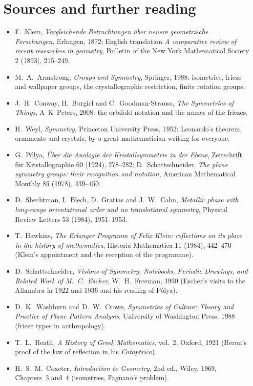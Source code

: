 \section*{Sources and further reading}

\begin{itemize}
\item F.~Klein, \emph{Vergleichende Betrachtungen \"uber neuere geometrische Forschungen}, Erlangen, 1872; English translation \emph{A
comparative review of recent researches in geometry}, Bulletin of the New York Mathematical Society 2 (1893), 215--249.
\item M.~A.~Armstrong, \emph{Groups and Symmetry}, Springer, 1988: isometries, frieze and wallpaper groups, the crystallographic restriction,
finite rotation groups.
\item J.~H.~Conway, H.~Burgiel and C.~Goodman-Strauss, \emph{The Symmetries of Things}, A~K~Peters, 2008: the orbifold notation and the names of
the friezes.
\item H.~Weyl, \emph{Symmetry}, Princeton University Press, 1952: Leonardo's theorem, ornaments and crystals, by a great mathematician writing
for everyone.
\item G.~P\'olya, \emph{\"Uber die Analogie der Kristallsymmetrie in der Ebene}, Zeitschrift f\"ur Kristallographie 60 (1924), 278--282;
D.~Schattschneider, \emph{The plane symmetry groups: their recognition and notation}, American Mathematical Monthly 85 (1978), 439--450.
\item D.~Shechtman, I.~Blech, D.~Gratias and J.~W.~Cahn, \emph{Metallic phase with long-range orientational order and no translational
symmetry}, Physical Review Letters 53 (1984), 1951--1953.
\item T.~Hawkins, \emph{The Erlanger Programm of Felix Klein: reflections on its place in the history of mathematics}, Historia
Mathematica 11 (1984), 442--470 (Klein's appointment and the reception of the programme).
\item D.~Schattschneider, \emph{Visions of Symmetry: Notebooks, Periodic Drawings, and Related Work of M.~C.~Escher}, W.~H.~Freeman, 1990
(Escher's visits to the Alhambra in 1922 and 1936 and his reading of P\'olya).
\item D.~K.~Washburn and D.~W.~Crowe, \emph{Symmetries of Culture: Theory and Practice of Plane Pattern Analysis}, University of Washington
Press, 1988 (frieze types in anthropology).
\item T.~L.~Heath, \emph{A History of Greek Mathematics}, vol.~2, Oxford, 1921 (Heron's proof of the law of reflection in his
\emph{Catoptrica}).
\item H.~S.~M.~Coxeter, \emph{Introduction to Geometry}, 2nd ed., Wiley, 1969, Chapters~3 and~4 (isometries, Fagnano's problem).
\end{itemize}
